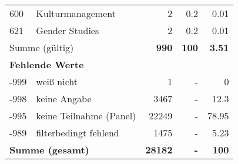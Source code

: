 \begin{longtable}{lXrrr}
        600 & \multicolumn{1}{X}{Kulturmanagement} & %
          \num{2} &
          \num[round-mode=places,round-precision=2]{0,2} &
          \num[round-mode=places,round-precision=2]{0,01} \\

        621 & \multicolumn{1}{X}{Gender Studies} & %
          \num{2} &
          \num[round-mode=places,round-precision=2]{0,2} &
          \num[round-mode=places,round-precision=2]{0,01} \\

     \midrule
     \multicolumn{2}{l}{Summe (gültig)} &
       \textbf{\num{990}} &
     \textbf{100} &
       \textbf{\num[round-mode=places,round-precision=2]{3,51}} \\
     \multicolumn{5}{l}{\textbf{Fehlende Werte}}\\
       -999 &
       weiß nicht &
         \num{1} &
        - &
         \num[round-mode=places,round-precision=2]{0} \\
       -998 &
       keine Angabe &
         \num{3467} &
        - &
         \num[round-mode=places,round-precision=2]{12,3} \\
       -995 &
       keine Teilnahme (Panel) &
         \num{22249} &
        - &
         \num[round-mode=places,round-precision=2]{78,95} \\
       -989 &
       filterbedingt fehlend &
         \num{1475} &
        - &
         \num[round-mode=places,round-precision=2]{5,23} \\
     \midrule
     \multicolumn{2}{l}{\textbf{Summe (gesamt)}} &
          \textbf{\num{28182}} &
        \textbf{-} &
        \textbf{100} \\
     \bottomrule
     \end{longtable}
     
